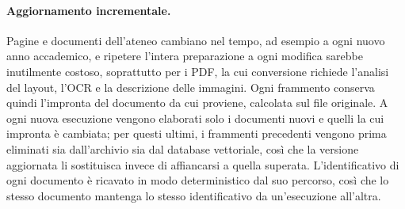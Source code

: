 \paragraph{Aggiornamento incrementale.} Pagine e documenti dell'ateneo cambiano nel tempo, ad esempio a ogni nuovo anno
accademico, e ripetere l'intera preparazione a ogni modifica sarebbe inutilmente costoso, soprattutto per i PDF, la cui
conversione richiede l'analisi del layout, l'OCR e la descrizione delle immagini. Ogni frammento conserva quindi
l'impronta del documento da cui proviene, calcolata sul file originale. A ogni nuova esecuzione vengono elaborati
solo i documenti nuovi e quelli la cui impronta è cambiata; per questi ultimi, i frammenti precedenti vengono prima
eliminati sia dall'archivio sia dal database vettoriale, così che la versione aggiornata li sostituisca invece di
affiancarsi a quella superata. L'identificativo di ogni documento è ricavato in modo deterministico dal suo
percorso, così che lo stesso documento mantenga lo stesso identificativo da un'esecuzione all'altra.
